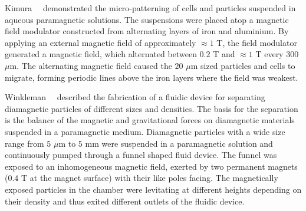 Kimura~\etal{}~\cite{Kimura2004,Kimura2005} demonstrated the micro-patterning of cells and particles suspended in aqueous paramagnetic solutions. The suspensions were placed atop a magnetic field modulator constructed from alternating layers of iron and aluminium. By applying an external magnetic field of approximately $\approx 1$ T, the field modulator generated a magnetic field, which alternated between $0.2$ T and $\approx 1$ T every $300$ $\mu$m. The alternating magnetic field caused the $20$ $\mu$m sized particles and cells to migrate, forming periodic lines above the iron layers where the field was weakest. 

Winkleman~\etal{}~\cite{Winkleman2007} described the fabrication of a fluidic device for separating diamagnetic particles of different sizes and densities. The basis for the separation is the balance of the magnetic and gravitational forces on diamagnetic materials suspended in a paramagnetic medium. Diamagnetic particles with a wide size range from $5$ $\mu$m to $5$ mm were suspended in a paramagnetic  solution and continuously pumped through a funnel shaped fluid device. The funnel was exposed to an inhomogeneous magnetic field, exerted by two permanent magnets ($0.4$ T at the magnet surface) with their like poles facing. The magnetically exposed particles in the chamber were levitating at different heights depending on their density and thus exited different outlets of the fluidic device.

